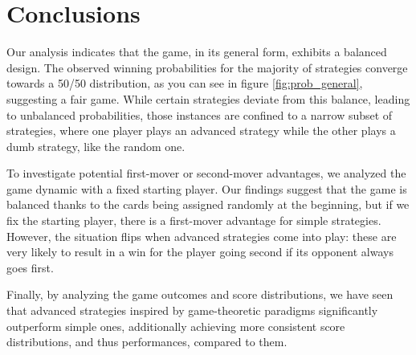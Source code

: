 \section{Conclusions} \label{section:Conclusions}
Our analysis indicates that the game, in its general form, exhibits a balanced design. The observed winning probabilities for the majority of strategies converge towards a 50/50 distribution, as you can see in figure \ref{fig:prob_general}, suggesting a fair game. While certain strategies deviate from this balance, leading to unbalanced probabilities, those instances are confined to a narrow subset of strategies, where one player plays an advanced strategy while the other plays a dumb strategy, like the random one.

To investigate potential first-mover or second-mover advantages, we analyzed the game dynamic with a fixed starting player. Our findings suggest that the game is balanced thanks to the cards being assigned randomly at the beginning, but if we fix the starting player, there is a first-mover advantage for simple strategies. However, the situation flips when advanced strategies come into play: these are very likely to result in a win for the player going second if its opponent always goes first.

Finally, by analyzing the game outcomes and score distributions, we have seen that advanced strategies inspired by game-theoretic paradigms significantly outperform simple ones, additionally achieving more consistent score distributions, and thus performances, compared to them.